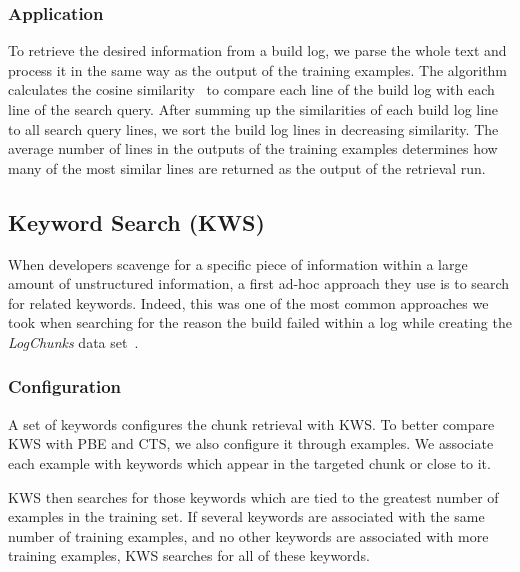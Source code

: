\subsubsection{Application}
To retrieve the desired information from a build log, we parse the
whole text and process it in the same way as the output of the
training examples.
The algorithm calculates the cosine
similarity~\cite{korenius2007principal} to compare each line of the
build log with each line of the search query.
After summing up the
similarities of each build log line to all search query lines, we sort
the build log lines in decreasing similarity.
The average number of
lines in the outputs of the training examples determines how many of
the most similar lines are returned as the output of the retrieval
run.

\subsection{Keyword Search (KWS)}
\label{sec:expl-skws}
When developers scavenge for a specific piece of information within a
large amount of unstructured information, a first ad-hoc approach they
use is to search for related keywords.
Indeed, this was one of the
most common approaches we took when searching for the reason the build
failed within a log while creating the \emph{LogChunks} data
set~\cite{brandt2020logchunks}.

\subsubsection{Configuration}
A set of keywords configures the chunk retrieval with KWS\@.
To better
compare KWS with PBE and CTS, we also configure it through examples.
We associate each example with keywords which appear in the targeted
chunk or close to it.

KWS then searches for those keywords which are tied to the greatest
number of examples in the training set.
If several keywords are associated with the same number of training
examples, and no other keywords are associated with more training
examples, KWS searches for all of these keywords.

